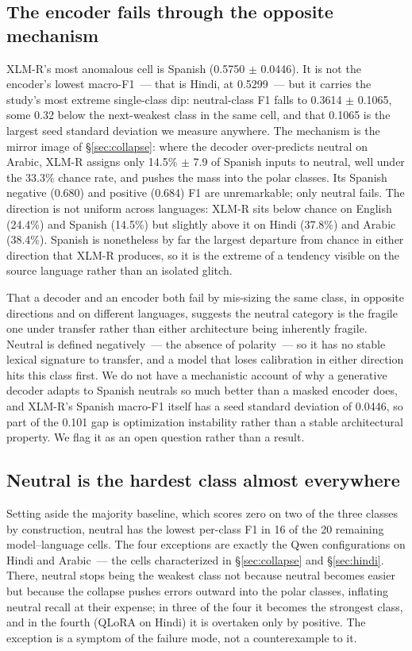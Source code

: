 \documentclass[11pt]{article}
\begin{document}
\subsection{The encoder fails through the opposite mechanism}
\label{sec:xlmr}

\mbox{XLM-R}'s most anomalous cell is Spanish (0.5750 $\pm$ 0.0446). It is not the
encoder's lowest macro-F1~--- that is Hindi, at 0.5299~--- but it carries the
study's most extreme single-class dip: neutral-class F1 falls to
0.3614 $\pm$ 0.1065, some 0.32 below the next-weakest class in the same cell, and
that 0.1065 is the largest seed standard deviation we measure anywhere. The mechanism is the mirror image of \S\ref{sec:collapse}: where the
decoder over-predicts neutral on Arabic, \mbox{XLM-R} assigns only 14.5\% $\pm$ 7.9 of
Spanish inputs to neutral, well under the 33.3\% chance rate, and pushes the mass
into the polar classes. Its Spanish negative (0.680) and positive (0.684) F1 are
unremarkable; only neutral fails. The direction is not uniform across languages:
\mbox{XLM-R} sits below chance on English (24.4\%) and Spanish (14.5\%) but slightly
above it on Hindi (37.8\%) and Arabic (38.4\%). Spanish is nonetheless by far the
largest departure from chance in either direction that \mbox{XLM-R} produces, so it is
the extreme of a tendency visible on the source language rather than an isolated
glitch.

That a decoder and an encoder both fail by mis-sizing the same class, in opposite
directions and on different languages, suggests the neutral category is the
fragile one under transfer rather than either architecture being inherently
fragile. Neutral is defined negatively~--- the absence of polarity~--- so it has
no stable lexical signature to transfer, and a model that loses calibration in
either direction hits this class first. We do not have a mechanistic account of
why a generative decoder adapts to Spanish neutrals so much better than a masked
encoder does, and \mbox{XLM-R}'s Spanish macro-F1 itself has a seed standard deviation
of 0.0446,
so part of the 0.101 gap is optimization instability rather than a stable
architectural property. We flag it as an open question rather than a result.

\subsection{Neutral is the hardest class almost everywhere}
Setting aside the majority baseline, which scores zero on two of the three classes
by construction, neutral has the lowest per-class F1 in 16 of the 20 remaining
model--language cells. The four exceptions are exactly the Qwen configurations on
Hindi and Arabic~--- the cells characterized in \S\ref{sec:collapse} and
\S\ref{sec:hindi}. There, neutral stops being the weakest class not because
neutral becomes easier but because the collapse pushes errors outward into the
polar classes, inflating neutral recall at their expense; in three of the four it
becomes the strongest class, and in the fourth (QLoRA on Hindi) it is overtaken
only by positive. The exception is a symptom of the failure mode, not a
counterexample to it.
\end{document}
